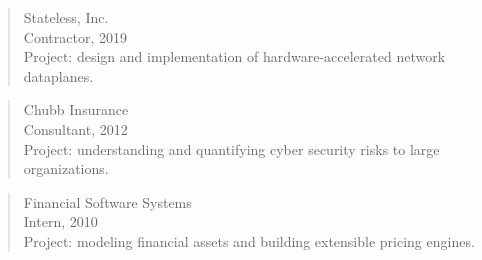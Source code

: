 \documentclass[a4paper,11pt]{article}
\begin{document}
\begin{quote}
Stateless, Inc.\\
Contractor, 2019\\
Project: design and implementation of hardware-accelerated network dataplanes.\\
\end{quote}

\begin{quote}
Chubb Insurance\\
Consultant, 2012\\
Project: understanding and quantifying cyber security risks to large organizations.\\
\end{quote}

\begin{quote}
Financial Software Systems\\
Intern, 2010\\
Project: modeling financial assets and building extensible pricing engines.\\
\end{quote}



\begin{publications}

\end{publications}





\end{document}
